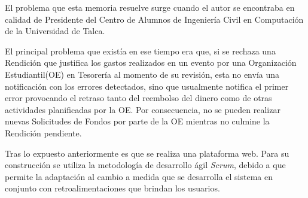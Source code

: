 \begin{resumen}


    El problema que esta memoria resuelve surge cuando el autor se encontraba en calidad de Presidente del Centro de Alumnos de Ingeniería Civil en Computación de la Universidad de Talca.
    
    
    El principal problema que existía en ese tiempo era que, si se rechaza una Rendición que justifica los gastos realizados en un evento por una Organización Estudiantil(OE) en Tesorería al momento de su revisión, esta no envía una notificación con los errores detectados, sino que usualmente notifica el primer error provocando el retraso tanto del reembolso del dinero como de otras actividades planificadas por la OE. Por consecuencia, no se pueden realizar nuevas Solicitudes de Fondos por parte de la OE mientras no culmine la Rendición pendiente.

    
    Tras lo expuesto anteriormente es que se realiza una plataforma web. Para su construcción se utiliza la metodología de desarrollo ágil \emph{Scrum}, debido a que permite la adaptación al cambio a medida que se desarrolla el sistema en conjunto con retroalimentaciones que brindan los usuarios.
    

    

\end{resumen}

